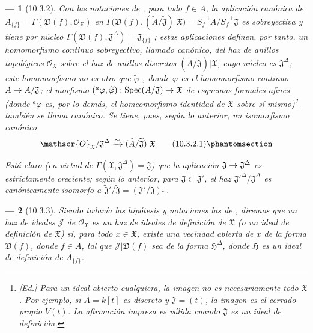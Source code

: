 \documentclass[oneside]{amsart}
\theoremstyle{ega-env-style}
\newtheorem*{env}{---}
\theoremstyle{ega-thm-env-style}
\theoremstyle{ega-defn-env-style}
\def\supertilde{{\,\widetilde{\,}\,}}   %
\renewcommand{\to}{\mathchoice{\longrightarrow}{\rightarrow}{\rightarrow}{\rightarrow}}
\newcommand{\oldpage}[2][]{{\marginnote{\normalfont{\textbf{#1}~|~#2}}}\ignorespaces}
\let\EGAOriginalLabel\label
\renewcommand{\label}[1]{\phantomsection\EGAOriginalLabel{#1}}
\begin{document}
\oldpage[I]{184}
\begin{env}[10.3.2]
\label{I.10.3.2}
Con las notaciones de , para todo $f\in A$, la aplicación canónica de $A_{\{f\}}=\Gamma(\mathfrak{D}(f),\mathscr{O}_{\mathfrak{X}})$ en $\Gamma\bigl(\mathfrak{D}(f),
(\widetilde{A}/\widetilde{\mathfrak{J}})|\mathfrak{X}\bigr)
=S_f^{-1}A/S_f^{-1}\mathfrak{J}$ es \emph{sobreyectiva} y tiene por núcleo $\Gamma(\mathfrak{D}(f),\mathfrak{J}^\Delta)=\mathfrak{J}_{\{f\}}$ ; estas aplicaciones definen, por tanto, un homomorfismo continuo \emph{sobreyectivo}, llamado \emph{canónico}, del haz de anillos topológicos $\mathscr{O}_{\mathfrak{X}}$ sobre el haz de anillos discretos $(\widetilde{A}/\widetilde{\mathfrak{J}})|\mathfrak{X}$, cuyo núcleo es $\mathfrak{J}^\Delta$; este homomorfismo no es otro que $\widetilde{\varphi}$ , donde $\varphi$ es el homomorfismo continuo $A\to A/\mathfrak{J}$; el morfismo $({}^a\varphi,\widetilde{\varphi}):
\operatorname{Spec}(A/\mathfrak{J})\to\mathfrak{X}$ de esquemas formales afines (donde ${}^a\varphi$ es, por lo demás, el homeomorfismo identidad de $\mathfrak{X}$ sobre sí mismo)\footnote{\emph{[Ed.] Para un ideal abierto cualquiera, la imagen no es necesariamente todo $\mathfrak{X}$. Por ejemplo, si $A=k[t]$ es discreto y $\mathfrak{J}=(t)$, la imagen es el cerrado propio $V(t)$. La afirmación impresa es válida cuando $\mathfrak{J}$ es un ideal de definición.}} también se llama \emph{canónico}.
Se tiene, pues, según lo anterior, un \emph{isomorfismo canónico}
\[
  \mathscr{O}_{\mathfrak{X}}/\mathfrak{J}^\Delta
  \xrightarrow{\sim}
  (\widetilde{A}/\widetilde{\mathfrak{J}})|\mathfrak{X}
  \tag{10.3.2.1}\label{I.10.3.2.1-fr}
\]

Está claro (en virtud de $\Gamma(\mathfrak{X},\mathfrak{J}^\Delta)=\mathfrak{J}$) que la aplicación $\mathfrak{J}\to\mathfrak{J}^\Delta$ es \emph{estrictamente creciente}; según lo anterior, para $\mathfrak{J}\subset\mathfrak{J}'$, el haz ${\mathfrak{J}'}^\Delta/\mathfrak{J}^\Delta$ es canónicamente isomorfo a $\widetilde{\mathfrak{J}}'/\widetilde{\mathfrak{J}}
=(\mathfrak{J}'/\mathfrak{J})\supertilde$.
\end{env}

\begin{env}[10.3.3]
\label{I.10.3.3}
Siendo todavía las hipótesis y notaciones las de , diremos que un haz de ideales $\mathscr{J}$ de $\mathscr{O}_{\mathfrak{X}}$ es un \emph{haz de ideales de definición} de $\mathfrak{X}$ (o un \emph{ideal de definición} de $\mathfrak{X}$) si, para todo $x\in\mathfrak{X}$, existe una vecindad abierta de $x$ de la forma $\mathfrak{D}(f)$, donde $f\in A$, tal que $\mathscr{J}|\mathfrak{D}(f)$ sea de la forma $\mathfrak{H}^\Delta$, donde $\mathfrak{H}$ es un ideal de definición de $A_{\{f\}}$.
\end{env}
\end{document}
